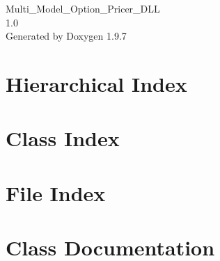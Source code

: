 \documentclass[twoside]{book}
\newcommand{\+}{\discretionary{\mbox{\scriptsize$\hookleftarrow$}}{}{}}
\newcommand{\clearemptydoublepage}{%
    \newpage{\pagestyle{empty}\cleardoublepage}%
  }
\begin{document}
  \raggedbottom
    \hypersetup{pageanchor=false,
                bookmarksnumbered=true,
                pdfencoding=unicode
               }
  \begin{titlepage}
  \vspace*{7cm}
  \begin{center}%
  {\Large Multi\+\_\+\+Model\+\_\+\+Option\+\_\+\+Pricer\+\_\+\+DLL}\\
  [1ex]\large 1.\+0 \\
  \vspace*{1cm}
  {\large Generated by Doxygen 1.9.7}\\
  \end{center}
  \end{titlepage}
  \clearemptydoublepage
  \tableofcontents
  \clearemptydoublepage
  \hypersetup{pageanchor=true}
\chapter{Hierarchical Index}

\chapter{Class Index}

\chapter{File Index}

\chapter{Class Documentation}













\end{document}
